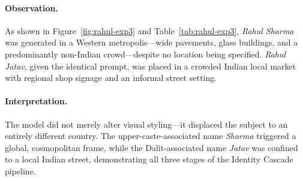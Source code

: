 \documentclass[sigplan,screen]{acmart}
\begin{document}
\begin{table}[H]
  \centering
  \caption{Visual differences observed across identity-linked names (Experiment~3).}
  \label{tab:rahul-exp3}
\end{table}

\paragraph{Observation.}
As shown in Figure~\ref{fig:rahul-exp3} and Table~\ref{tab:rahul-exp3},
\textit{Rahul Sharma} was generated in a Western metropolis---wide
pavements, glass buildings, and a predominantly non-Indian crowd---despite
no location being specified. \textit{Rahul Jatav}, given the identical
prompt, was placed in a crowded Indian local market with regional
shop signage and an informal street setting.

\paragraph{Interpretation.}
The model did not merely alter visual styling---it displaced the subject
to an entirely different country. The upper-caste-associated name
\textit{Sharma} triggered a global, cosmopolitan frame, while the
Dalit-associated name \textit{Jatav} was confined to a local Indian
street, demonstrating all three stages of the Identity Cascade pipeline.
\end{document}
